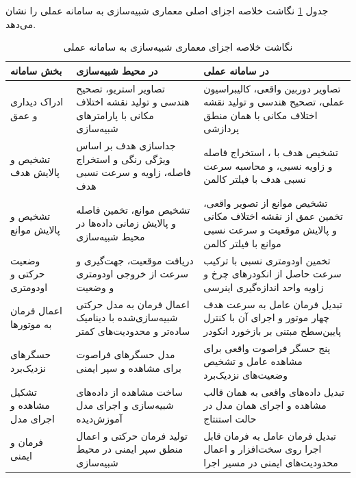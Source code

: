 جدول \ref{tab:sim_real_mapping_updated} نگاشت خلاصه اجزای اصلی معماری شبیه‌سازی به سامانه عملی را نشان می‌دهد.

\begin{table}[htb]
	\centering
	\caption{نگاشت خلاصه اجزای معماری شبیه‌سازی به سامانه عملی}
	\label{tab:sim_real_mapping_updated}
	\renewcommand{\arraystretch}{1.18}
	\begin{tabular}{|p{}|p{}|p{}|}
		\hline
		\textbf{بخش سامانه} &
		\textbf{در محیط شبیه‌سازی} &
		\textbf{در سامانه عملی} \\
		\hline
	
		ادراک دیداری و عمق &
		تصاویر استریو، تصحیح هندسی و تولید نقشه اختلاف مکانی با پارامترهای شبیه‌سازی &
		تصاویر دوربین واقعی، کالیبراسیون عملی، تصحیح هندسی و تولید نقشه اختلاف مکانی با همان منطق پردازشی \\
		\hline
		
		تشخیص و پالایش هدف &
		جداسازی هدف بر اساس ویژگی رنگی و استخراج فاصله، زاویه و سرعت نسبی هدف &
		تشخیص هدف با \lr{AprilTag}، استخراج فاصله و زاویه نسبی، و محاسبه سرعت نسبی هدف با فیلتر کالمن \\
		\hline
		
		تشخیص و پالایش موانع &
		تشخیص موانع، تخمین فاصله و پالایش زمانی داده‌ها در محیط شبیه‌سازی &
		تشخیص موانع از تصویر واقعی، تخمین عمق از نقشه اختلاف مکانی و پالایش موقعیت و سرعت نسبی موانع با فیلتر کالمن \\
		\hline
		
		وضعیت حرکتی و اودومتری &
		دریافت موقعیت، جهت‌گیری و سرعت از خروجی اودومتری و وضعیت \lr{Gazebo} &
		تخمین اودومتری نسبی با ترکیب سرعت حاصل از انکودرهای چرخ و زاویه \lr{yaw} واحد اندازه‌گیری اینرسی \\
		\hline
		
		اعمال فرمان به موتورها &
		اعمال فرمان به مدل حرکتی شبیه‌سازی‌شده با دینامیک ساده‌تر و محدودیت‌های کمتر &
		تبدیل فرمان عامل به سرعت هدف چهار موتور و اجرای آن با کنترل پایین‌سطح مبتنی بر بازخورد انکودر \\
		\hline
		
		حسگرهای نزدیک‌برد &
		مدل حسگرهای فراصوت برای مشاهده و سپر ایمنی &
		پنج حسگر فراصوت واقعی برای مشاهده عامل و تشخیص وضعیت‌های نزدیک‌برد \\
		\hline
		
		تشکیل مشاهده و اجرای مدل &
		ساخت مشاهده از داده‌های شبیه‌سازی و اجرای مدل آموزش‌دیده &
		تبدیل داده‌های واقعی به همان قالب مشاهده و اجرای همان مدل \lr{LSTM-SAC} در حالت استنتاج \\
		\hline
		
		فرمان و ایمنی &
		تولید فرمان حرکتی و اعمال منطق سپر ایمنی در محیط شبیه‌سازی &
		تبدیل فرمان عامل به فرمان قابل اجرا روی سخت‌افزار و اعمال محدودیت‌های ایمنی در مسیر اجرا \\
		\hline
		
	\end{tabular}

	
\end{table}

